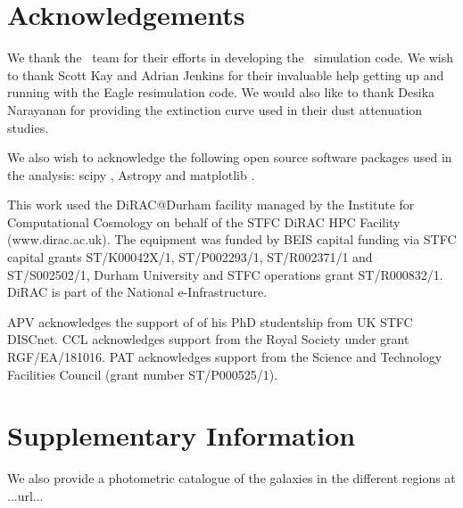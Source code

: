 \documentclass[fleqn,usenatbib]{mnras}
\newcommand{\eagle}{\mbox{\sc{Eagle}}}
\begin{document}
\section*{Acknowledgements}
We thank the \eagle\, team for their efforts in developing the \eagle\, simulation code. We wish to thank Scott Kay and Adrian Jenkins for their invaluable help getting up and running with the Eagle resimulation code. We would also like to thank Desika Narayanan for providing the extinction curve used in their dust attenuation studies.

We also wish to acknowledge the following open source software packages used in the analysis: scipy \citep{2020SciPy-NMeth}, Astropy \citep{robitaille_astropy:_2013} and matplotlib \citep{Hunter:2007}.

This work used the DiRAC@Durham facility managed by the Institute for Computational Cosmology on behalf of the STFC DiRAC HPC Facility (www.dirac.ac.uk). The equipment was funded by BEIS capital funding via STFC capital grants ST/K00042X/1, ST/P002293/1, ST/R002371/1 and ST/S002502/1, Durham University and STFC operations grant ST/R000832/1. DiRAC is part of the National e-Infrastructure.

APV acknowledges the support of of his PhD studentship from UK STFC DISCnet. CCL acknowledges support from the Royal Society under
grant RGF/EA/181016. PAT acknowledges support from the Science and Technology Facilities Council (grant number ST/P000525/1).





\section*{Supplementary Information}
We also provide a photometric catalogue of the galaxies in the different regions at ...url...


\appendix





\bsp	%
\label{lastpage}
\end{document}

